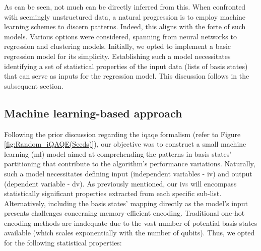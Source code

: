 As can be seen, not much can be directly inferred from this. When confronted with seemingly unstructured data, a natural progression is to employ machine learning schemes to discern patterns. Indeed, this aligns with the forte of such models. Various options were considered, spanning from neural networks to regression and clustering models. Initially, we opted to implement a basic regression model for its simplicity. Establishing such a model necessitates identifying a set of statistical properties of the input data (lists of basis states) that can serve as inputs for the regression model. This discussion follows in the subsequent section.

\vspace{-2.5mm}
\subsection*{Machine learning-based approach}
Following the prior discussion regarding the \acrshort{iqaqe} formalism (refer to Figure \ref{fig:Random_iQAQE(Seeds)}), our objective was to construct a small machine learning (\acrshort{ml}) model aimed at comprehending the patterns in basis states' partitioning that contribute to the algorithm's performance variations. Naturally, such a model necessitates defining input (independent variables - \acrshort{iv}) and output (dependent variable - \acrshort{dv}). As previously mentioned, our \acrshort{iv}\textcolor{gray}{s} will encompass statistically significant properties extracted from each specific sub-list. Alternatively, including the basis states' mapping directly as the model's input presents challenges concerning memory-efficient encoding. Traditional one-hot encoding methods are inadequate due to the vast number of potential basis states available (which scales exponentially with the number of qubits). Thus, we opted for the following statistical properties:
